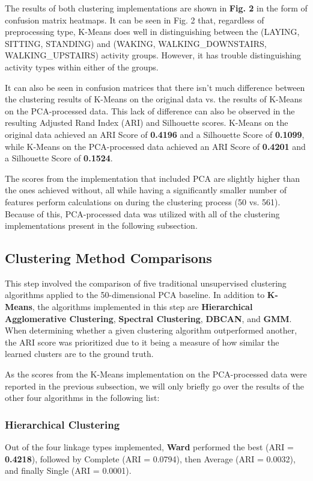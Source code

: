 \documentclass[12pt]{IEEEtran}
\begin{document}
The results of both clustering implementations are shown in \textbf{Fig. 2} in the form of confusion matrix heatmaps. It can be seen in Fig. 2 that, regardless of preprocessing type, K-Means does well in distinguishing between the (LAYING, SITTING, STANDING) and (WAKING, WALKING\_DOWNSTAIRS, WALKING\_UPSTAIRS) activity groups. However, it has trouble distinguishing activity types within either of the groups. 

It can also be seen in confusion matrices that there isn't much difference between the clustering results of K-Means on the original data vs. the results of K-Means on the PCA-processed data. This lack of difference can also be observed in the resulting Adjusted Rand Index (ARI) and Silhouette scores. K-Means on the original data achieved an ARI Score of \textbf{0.4196} and a Silhouette Score of \textbf{0.1099}, while K-Means on the PCA-processed data achieved an ARI Score of \textbf{0.4201} and a Silhouette Score of \textbf{0.1524}. 

The scores from the implementation that included PCA are slightly higher than the ones achieved without, all while having a significantly smaller number of features perform calculations on during the clustering process (50 vs. 561). Because of this,  PCA-processed data was utilized with all of the clustering implementations present in the following subsection.

\subsection{Clustering Method Comparisons}

This step involved the comparison of five traditional unsupervised clustering algorithms applied to the 50-dimensional PCA baseline. In addition to \textbf{K-Means}, the algorithms implemented in this step are \textbf{Hierarchical Agglomerative Clustering}, \textbf{Spectral Clustering}, \textbf{DBCAN}, and \textbf{GMM}. When determining whether a given clustering algorithm outperformed another, the ARI score was prioritized due to it being a measure of how similar the learned clusters are to the ground truth.

As the scores from the K-Means implementation on the PCA-processed data were reported in the previous subsection, we will only briefly go over the results of the other four algorithms in the following list:

\subsubsection{Hierarchical Clustering} Out of the four linkage types implemented, \textbf{Ward} performed the best (ARI = \textbf{0.4218}), followed by Complete (ARI = 0.0794), then Average (ARI = 0.0032), and finally Single (ARI = 0.0001).
\end{document}
